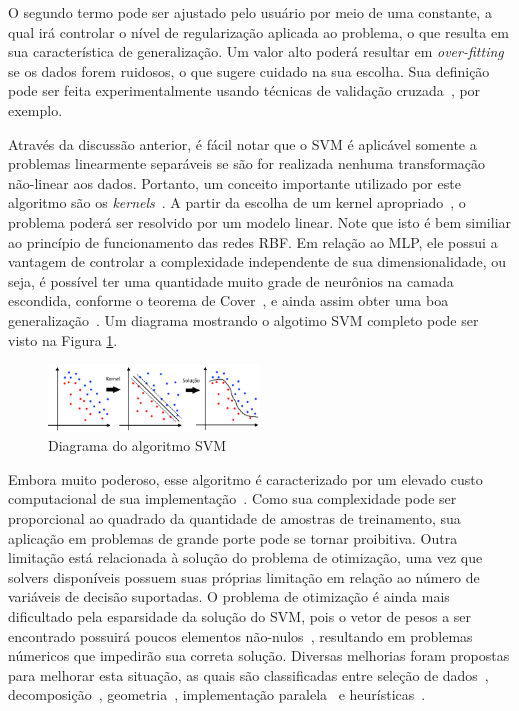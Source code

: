 \documentclass[conference]{IEEEtran}
\begin{document}
	O segundo termo pode ser ajustado pelo usuário por meio de uma constante, a qual irá controlar o nível de regularização aplicada ao problema, o que resulta em sua característica de generalização. Um valor alto poderá resultar em \textit{over-fitting} se os dados forem ruidosos, o que sugere cuidado na sua escolha.	Sua definição pode ser feita experimentalmente usando técnicas de validação cruzada~\cite{arlot2010survey}, por exemplo.
	
	Através da discussão anterior, é fácil notar que o SVM é aplicável somente a problemas linearmente separáveis se são for realizada nenhuma transformação não-linear aos dados. Portanto, um conceito importante utilizado por este algoritmo são os \textit{kernels}~\cite{shawetaylor2004kernel}. A partir da escolha de um kernel apropriado~\cite{mercer1909xvi,courant89}, o problema poderá ser resolvido por um modelo linear. Note que isto é bem similiar ao princípio de funcionamento das redes RBF. Em relação ao MLP, ele possui a vantagem de controlar a complexidade independente de sua dimensionalidade, ou seja, é possível ter uma quantidade muito grade de neurônios na camada escondida, conforme o teorema de Cover~\cite{cover1965geometrical}, e ainda assim obter uma boa generalização~\cite{scholkopf2018learning}. 	Um diagrama mostrando o algotimo SVM completo pode ser visto na Figura \ref{fig:svm-completo}.
	
	\begin{figure}[thpbh]
		\centering
		\includegraphics[width=0.5\textwidth]{svm-completo.png}
		\caption{Diagrama do algoritmo SVM}
		\label{fig:svm-completo}
	\end{figure}
	
 	Embora muito poderoso, esse algoritmo é caracterizado por um elevado custo computacional de sua implementação~\cite{bottou2007support}. Como sua complexidade pode ser proporcional ao quadrado da quantidade de amostras de treinamento, sua aplicação em problemas de grande porte pode se tornar proibitiva. Outra limitação está relacionada à solução do problema de otimização, uma vez que solvers disponíveis possuem suas próprias limitação em relação ao número de variáveis de decisão suportadas. O problema de otimização é ainda mais dificultado pela esparsidade da solução do SVM, pois o vetor de pesos a ser encontrado possuirá poucos elementos não-nulos~\cite{haykin2007neural}, resultando em problemas númericos que impedirão sua correta solução. Diversas melhorias foram propostas para melhorar esta situação, as quais são classificadas entre seleção de dados~\cite{wang2005training}, decomposição~\cite{dong2005fast}, geometria~\cite{zeng2008geometric}, implementação paralela~\cite{graf2004parallel} e heurísticas~\cite{decoste2000alpha}.
 	
\end{document}
